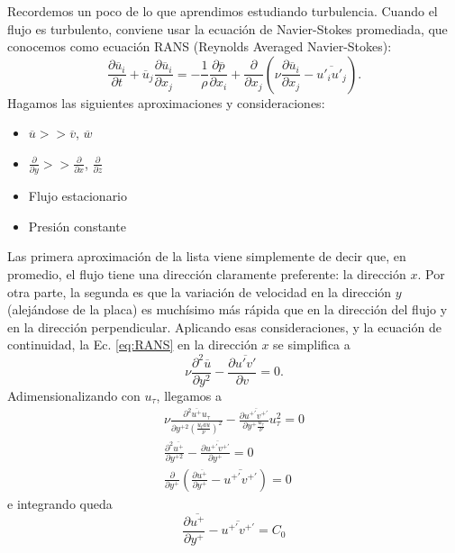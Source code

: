 Recordemos un poco de lo que aprendimos estudiando turbulencia.
Cuando el flujo es turbulento, conviene usar la ecuación de Navier-Stokes promediada, que conocemos como ecuación RANS (Reynolds Averaged Navier-Stokes):
%
\begin{equation}\label{eq:RANS}
\frac{\partial \overline{u}_i}{\partial t} + \overline{u}_j\frac{\partial \overline{u}_i}{\partial x_j}  = -\frac{1}{\rho}\frac{\partial \overline{p}}{\partial x_i} + \frac{\partial}{\partial x_j}\left(\nu \frac{\partial \overline{u}_i}{\partial x_j} - \overline{u'_iu'_j}\right).
\end{equation}
%
Hagamos las siguientes aproximaciones y consideraciones:
%
\begin{itemize}
\item $\overline{u} >> \overline{v}$, $\overline{w}$
\item $\frac{\partial}{\partial y} >> \frac{\partial}{\partial x}$, $\frac{\partial}{\partial z}$
\item Flujo estacionario
\item Presión constante
\end{itemize}
%
Las primera aproximación de la lista viene simplemente de decir que, en promedio, el flujo tiene una dirección claramente preferente: la dirección $x$.
Por otra parte, la segunda es que la variación de velocidad en la dirección $y$ (alejándose de la placa) es muchísimo más rápida que en la dirección del flujo y en la dirección perpendicular.
Aplicando esas consideraciones, y la ecuación de continuidad, la Ec. \eqref{eq:RANS} en la dirección $x$ se simplifica a 
%
\begin{equation}
\nu\frac{\partial^2 \overline{u}}{\partial y^2} - \frac{\partial \overline{u'v'}}{\partial v} = 0.
\end{equation}
%
Adimensionalizando con $u_\tau$, llegamos a
%
\begin{align}
\nu\frac{\partial^2\overline{u^+}u_\tau}{\partial y^{+2}\left(\frac{u_tau}{\nu}\right)^2} - \frac{\partial \overline{u^{+\prime}v^{+\prime}}}{\partial y^+\frac{u_\tau}{\nu}}u_\tau^2 = 0\nonumber\\
\frac{\partial^2\overline{u^+}}{\partial y^{+2}}-\frac{\partial \overline{u^{+\prime}v^{+\prime}}}{\partial y^+} = 0\nonumber\\
\frac{\partial}{\partial y^+}\left(\frac{\partial\overline{u^+}}{\partial y^+}-\overline{u^{+\prime}v^{+\prime}}\right) = 0
\end{align}
%
e integrando queda
%
\begin{equation}\label{eq:uplus_aux}
\frac{\partial\overline{u^+}}{\partial y^+}-\overline{u^{+\prime}v^{+\prime}}= C_0
\end{equation}

